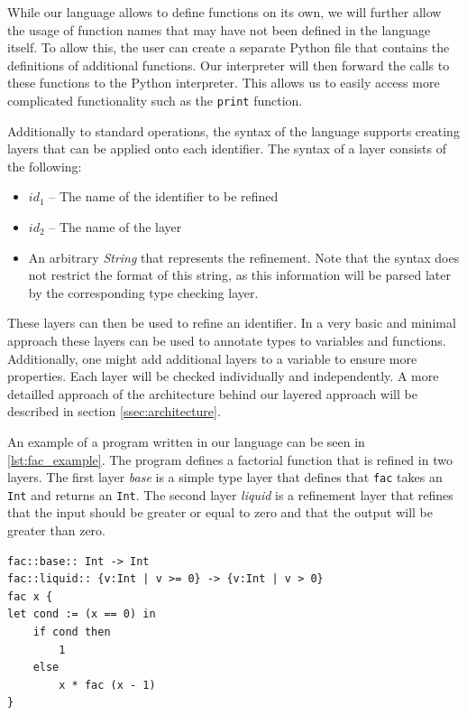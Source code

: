 \documentclass[acmsmall, review, screen]{acmart}
\begin{document}
While our language allows to define functions on its own, we will further allow the usage of function names that may have not been defined in the language itself. To allow this, the user can create a separate Python file that contains the definitions of additional functions. Our interpreter will then forward the calls to these functions to the Python interpreter. This allows us to easily access more complicated functionality such as the \texttt{print} function.

Additionally to standard operations, the syntax of the language supports creating layers that can be applied onto each identifier. The syntax of a layer consists of the following:
\begin{itemize}
	\item $id_1$ -- The name of the identifier to be refined
	\item $id_2$ -- The name of the layer
	\item An arbitrary \textit{String} that represents the refinement. Note that the syntax does not restrict the format of this string, as this information will be parsed later by the corresponding type checking layer.
\end{itemize}

These layers can then be used to refine an identifier. In a very basic and minimal approach these layers can be used to annotate types to variables and functions. Additionally, one might add additional layers to a variable to ensure more properties. Each layer will be checked individually and independently. A more detailled approach of the architecture behind our layered approach will be described in section \ref{ssec:architecture}.

An example of a program written in our language can be seen in \ref{lst:fac_example}. The program defines a factorial function that is refined in two layers. The first layer \textit{base} is a simple type layer that defines that \texttt{fac} takes an \texttt{Int} and returns an \texttt{Int}. The second layer \textit{liquid} is a refinement layer that refines that the input should be greater or equal to zero and that the output will be greater than zero.

\begin{lstlisting}[caption={Example of a factorial function in our simple language}, label={lst:fac_example}]
fac::base:: Int -> Int
fac::liquid:: {v:Int | v >= 0} -> {v:Int | v > 0}
fac x { 
let cond := (x == 0) in
	if cond then 
		1 
	else 
		x * fac (x - 1) 
}
\end{lstlisting}
\end{document}
